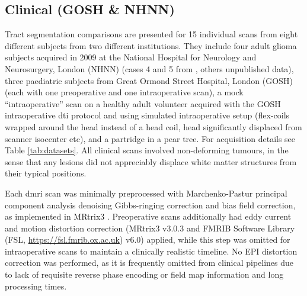 \subsection{Clinical (GOSH \& NHNN)}

Tract segmentation comparisons are presented for 15 individual scans from eight different subjects from two different institutions.
They include four adult glioma subjects acquired in 2009 at the National Hospital for Neurology and Neurosurgery, London (NHNN) (cases 4 and 5 from \textcite{Mancini2022}, others unpublished data),
three paediatric subjects from Great Ormond Street Hospital, London (GOSH) (each with one preoperative and one intraoperative scan),
a mock “intraoperative” scan on a healthy adult volunteer acquired with the GOSH intraoperative \gls{dti} protocol and using simulated intraoperative setup (flex-coils wrapped around the head instead of a head coil, head significantly displaced from scanner isocenter etc),
and a partridge in a pear tree.
For acquisition details see Table \ref{tab:datasets}.
All clinical scans involved non-deforming tumours, in the sense that any lesions did not appreciably displace white matter structures from their typical positions.

Each \gls{dmri} scan was minimally preprocessed with Marchenko-Pastur principal component analysis denoising\autocite{Veraart2016, Cordero-Grande2019} Gibbs-ringing correction\autocite{Kellner2016} and bias field correction,\autocite{Zhang2001, Smith2004} as implemented in MRtrix3 \autocite{Tournier2019}.
Preoperative scans additionally had eddy current and motion distortion correction\autocite{Andersson2016a, Smith2004} (MRtrix3 v3.0.3 and FMRIB Software Library (FSL, \url{https://fsl.fmrib.ox.ac.uk}) v6.0) applied, while this step was omitted for intraoperative scans to maintain a clinically realistic timeline.
No EPI distortion correction was performed, as it is frequently omitted from clinical pipelines due to lack of requisite reverse phase encoding or field map information and long processing times.\autocite{Yang2022}


